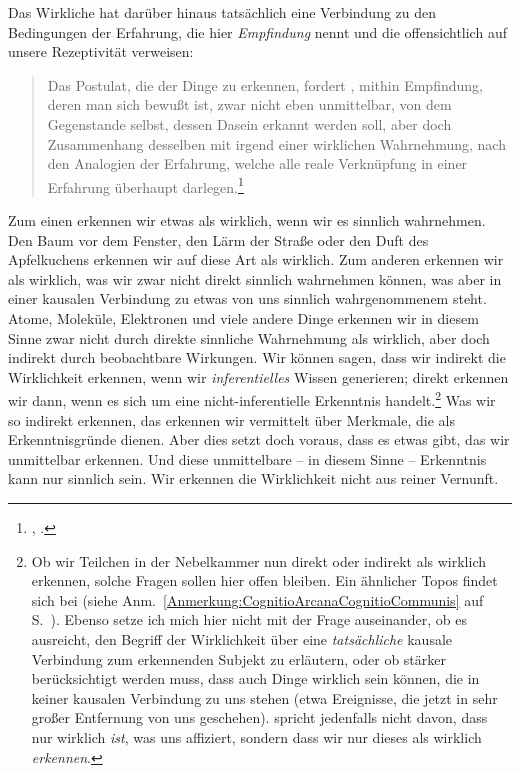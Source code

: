 Das Wirkliche hat darüber hinaus tatsächlich eine Verbindung zu den
 Bedingungen der Erfahrung, die  hier \emph{Empfindung}
nennt und die offensichtlich auf unsere Rezeptivität verweisen:
\begin{quote}
Das Postulat, die  der Dinge zu erkennen, fordert
, mithin Empfindung, deren man sich bewußt ist, zwar nicht
eben unmittelbar, von dem Gegenstande selbst, dessen Dasein erkannt werden
soll, aber doch Zusammenhang desselben mit irgend einer wirklichen
Wahrnehmung, nach den Analogien der Erfahrung, welche alle reale Verknüpfung
in einer Erfahrung überhaupt darlegen.\footnote{\cite[][B
272]{Kant:KritikderreinenVernunft2003}, \cite[][III:
189.23--28]{Kant:GesammelteWerke1900ff.}.}
\end{quote}
Zum einen erkennen wir etwas als wirklich, wenn wir es sinnlich wahrnehmen. Den
Baum vor dem Fenster, den Lärm der Straße oder den Duft des Apfelkuchens
erkennen wir auf diese Art als wirklich. Zum anderen erkennen wir als wirklich,
was wir zwar nicht direkt sinnlich wahrnehmen können, was aber in einer kausalen
Verbindung zu etwas von uns sinnlich wahrgenommenem steht. Atome, Moleküle,
Elektronen und viele andere Dinge erkennen wir in diesem Sinne zwar nicht durch
direkte sinnliche Wahrnehmung als wirklich, aber doch indirekt durch
beobachtbare Wirkungen. Wir können sagen, dass wir indirekt die Wirklichkeit
erkennen, wenn wir \emph{inferentielles} Wissen generieren; direkt erkennen wir
dann, wenn es sich um eine nicht-inferentielle Erkenntnis handelt.\footnote{Ob
wir Teilchen in der Nebelkammer nun direkt oder indirekt als wirklich erkennen, solche Fragen sollen hier offen bleiben.
Ein ähnlicher Topos findet sich bei
 (siehe
Anm.~\ref{Anmerkung:CognitioArcanaCognitioCommunis} auf
S.~\pageref{Anmerkung:CognitioArcanaCognitioCommunis}). Ebenso setze ich mich
hier nicht mit der Frage auseinander, ob es ausreicht, den Begriff der
Wirklichkeit über eine \emph{tatsächliche} kausale Verbindung zum erkennenden
Subjekt zu erläutern, oder ob stärker berücksichtigt werden muss, dass auch
Dinge wirklich sein können, die in keiner kausalen Verbindung zu uns stehen
(etwa Ereignisse, die jetzt in sehr großer Entfernung von uns geschehen).
 spricht jedenfalls nicht davon, dass nur wirklich
\emph{ist}, was uns affiziert, sondern dass wir nur dieses als wirklich
\emph{erkennen}.} Was wir so indirekt erkennen, das erkennen wir vermittelt über
Merkmale, die als Erkenntnisgründe dienen. Aber dies setzt doch voraus, dass es
etwas gibt, das wir unmittelbar erkennen. Und diese unmittelbare -- in diesem
Sinne  -- Erkenntnis kann nur sinnlich sein. Wir erkennen
die Wirklichkeit nicht aus reiner Vernunft.

